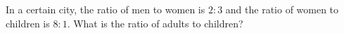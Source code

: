 In a certain city, the ratio of men to women is $2:3$ and the ratio of women to children is $8:1$. What is the ratio of adults to children?
